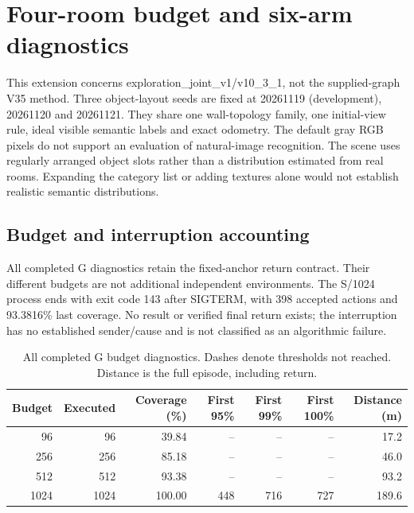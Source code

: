 \section{Four-room budget and six-arm diagnostics}

This extension concerns exploration\_joint\_v1/v10\_3\_1, not the supplied-graph V35 method. Three object-layout seeds are fixed at 20261119 (development), 20261120 and 20261121. They share one wall-topology family, one initial-view rule, ideal visible semantic labels and exact odometry. The default gray RGB pixels do not support an evaluation of natural-image recognition. The scene uses regularly arranged object slots rather than a distribution estimated from real rooms. Expanding the category list or adding textures alone would not establish realistic semantic distributions.

\subsection{Budget and interruption accounting}

All completed G diagnostics retain the fixed-anchor return contract. Their different budgets are not additional independent environments. The S/1024 process ends with exit code 143 after SIGTERM, with 398 accepted actions and 93.3816\% last coverage. No result or verified final return exists; the interruption has no established sender/cause and is not classified as an algorithmic failure.

\begin{table}[!htbp]\centering\small\caption{All completed G budget diagnostics. Dashes denote thresholds not reached. Distance is the full episode, including return.}\label{tab:s-four-room-budget}

\begin{tabular}{@{}rrrrrrr@{}}\toprule Budget & Executed & Coverage (\%) & First 95\% & First 99\% & First 100\% & Distance (m) \\ \midrule

96 & 96 & 39.84 & -- & -- & -- & 17.2 \\

256 & 256 & 85.18 & -- & -- & -- & 46.0 \\

512 & 512 & 93.38 & -- & -- & -- & 93.2 \\

1024 & 1024 & 100.00 & 448 & 716 & 727 & 189.6 \\

\bottomrule\end{tabular}\end{table}

